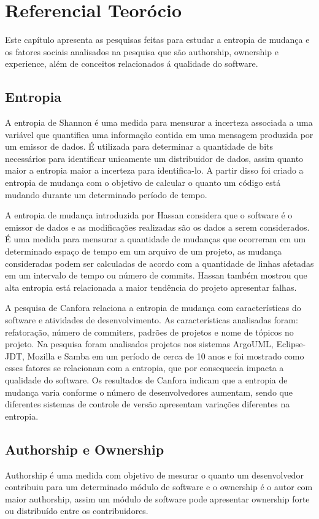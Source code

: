 \chapter{Referencial Teorócio}
Este capítulo apresenta as pesquisas feitas para estudar a entropia de mudança e os fatores sociais analisados na pesquisa que são authorship, ownership e experience, além de conceitos relacionados á qualidade do software. 

\section{Entropia}
A entropia de Shannon\cite{Shannon:2001:MTC:584091.584093} é uma medida para mensurar a incerteza associada a uma variável que quantifica uma informação contida em uma mensagem produzida por um emissor de dados. É utilizada para determinar a quantidade de bits necessários para identificar unicamente um distribuidor de dados, assim quanto maior a entropia maior a incerteza para identifica-lo. A partir disso foi criado a entropia de mudança com o objetivo de calcular o quanto um código está mudando durante um determinado período de tempo. 

A entropia de mudança introduzida por Hassan\cite{Hassan:2009:PFU:1555001.1555024} considera que o software é o emissor de dados e as modificações realizadas são os dados a serem considerados. É uma medida para mensurar a quantidade de mudanças que ocorreram em um determinado espaço de tempo em um arquivo de um projeto, as mudança consideradas podem ser calculadas de acordo com a quantidade de linhas afetadas em um intervalo de tempo ou número de commits. Hassan também mostrou que alta entropia está relacionada a maior tendência do projeto apresentar falhas.

A pesquisa de Canfora\cite{Canfora2014} relaciona a entropia de mudança com características do software e atividades de desenvolvimento. As características analisadas foram: refatoração, número de commiters, padrões de projetos e nome de tópicos no projeto. Na pesquisa foram analisados projetos nos sistemas ArgoUML, Eclipse-JDT, Mozilla e Samba em um período de cerca de 10 anos e foi mostrado como esses fatores se relacionam com a entropia, que por consequecia impacta a qualidade do software. Os resultados de Canfora indicam que a entropia de mudança varia conforme o número de desenvolvedores aumentam, sendo que diferentes sistemas de controle de versão apresentam variações diferentes na entropia.


\section{Authorship e Ownership}
Authorship é uma medida com objetivo de mesurar o quanto um desenvolvedor contribuiu para um determinado módulo de software e o ownership é o autor com maior authorship, assim um módulo de software pode apresentar ownership forte ou distribuído entre os contribuidores.

